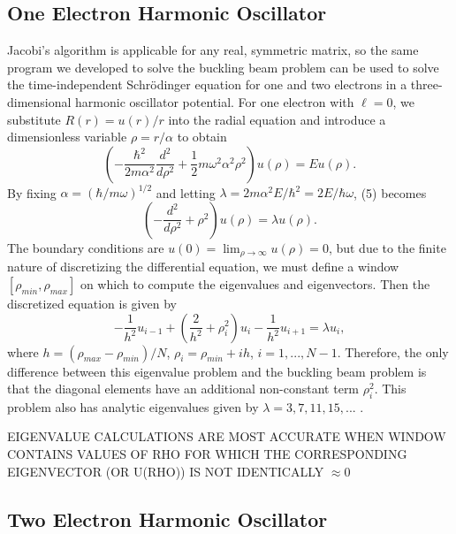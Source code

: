 \documentclass[prb,aps,twocolumn,showpacs,10pt]{revtex4-1}
\begin{document}
\subsection{One Electron Harmonic Oscillator}
Jacobi's algorithm is applicable for any real, symmetric matrix, so the same program we developed to solve the buckling beam problem can be used to solve the time-independent Schr{\"o}dinger equation for one and two electrons in a three-dimensional harmonic oscillator potential. For one electron with $\ell=0$, we substitute $R(r)=u(r)/r$ into the radial equation and introduce a dimensionless variable $\rho = r/\alpha$ to obtain
\begin{equation}
\left( -\frac{\hbar^2}{2m\alpha^2} \frac{d^2}{d\rho^2} + \frac{1}{2}m\omega^2\alpha^2\rho^2 \right) u(\rho) = E u(\rho). 
\end{equation}
By fixing $\alpha=(\hbar/m\omega)^{1/2}$ and letting $\lambda=2m\alpha^2 E/\hbar^2 = 2E/\hbar\omega$, (5) becomes 
\begin{equation}
\left( -\frac{d^2}{d\rho^2} + \rho^2 \right) u(\rho) = \lambda u(\rho).
\end{equation}
The boundary conditions are $u(0)=\lim_{\rho \rightarrow \infty} u(\rho)=0$, but due to the finite nature of discretizing the differential equation, we must define a window $[\rho_{min}, \rho_{max}]$ on which to compute the eigenvalues and eigenvectors. Then the discretized equation is given by
\begin{equation}
-\frac{1}{h^2} u_{i-1} + \left( \frac{2}{h^2} + \rho_i^2 \right) u_i -\frac{1}{h^2} u_{i+1} = \lambda u_i, 
\end{equation}
where $h=(\rho_{max}-\rho_{min})/N$, $\rho_i = \rho_{min} + ih$, $i = 1, ..., N-1$. Therefore, the only difference between this eigenvalue problem and the buckling beam problem is that the diagonal elements have an additional non-constant term $\rho_i^2$. This problem also has analytic eigenvalues given by $\lambda = 3, 7, 11, 15, ...$ .

EIGENVALUE CALCULATIONS ARE MOST ACCURATE WHEN WINDOW CONTAINS VALUES OF RHO FOR WHICH THE CORRESPONDING EIGENVECTOR (OR U(RHO)) IS NOT IDENTICALLY $\approx 0$

\subsection{Two Electron Harmonic Oscillator}
\end{document}
